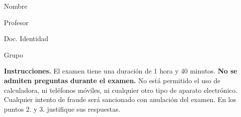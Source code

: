 \documentclass[11pt]{article}
\begin{document}
\examheader

\vspace{4pt}
\noindent
\begin{minipage}[t]{0.62\linewidth}
Nombre \dotfill

\vspace{4pt}
Profesor \dotfill
\end{minipage}%
\hfill
\begin{minipage}[t]{0.32\linewidth}
Doc. Identidad \dotfill

\vspace{4pt}
Grupo \dotfill
\end{minipage}

\vspace{6pt}
\noindent\textbf{Instrucciones.} El examen tiene una duración de 1 hora y 40 minutos. \textbf{No se admiten preguntas durante el examen.} No está permitido el uso de calculadora, ni teléfonos móviles, ni cualquier otro tipo de aparato electrónico. Cualquier intento de fraude será sancionado con anulación del examen. En los puntos 2. y 3. justifique sus respuestas.
\end{document}
